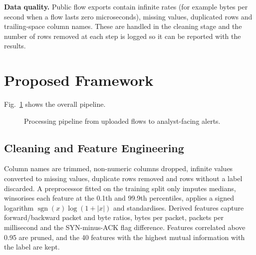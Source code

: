 \documentclass[conference]{IEEEtran}
\begin{document}
\textbf{Data quality.} Public flow exports contain infinite rates (for example bytes per second when a flow lasts zero microseconds), missing values, duplicated rows and trailing-space column names. These are handled in the cleaning stage and the number of rows removed at each step is logged so it can be reported with the results.

\section{Proposed Framework}
Fig.~\ref{fig:arch} shows the overall pipeline.

\begin{figure}[!htb]
\centering
{}
\caption{Processing pipeline from uploaded flows to analyst-facing alerts.}
\label{fig:arch}
\end{figure}

\subsection{Cleaning and Feature Engineering}
Column names are trimmed, non-numeric columns dropped, infinite values converted to missing values, duplicate rows removed and rows without a label discarded. A preprocessor fitted on the training split only imputes medians, winsorises each feature at the 0.1th and 99.9th percentiles, applies a signed logarithm $\operatorname{sgn}(x)\log(1+|x|)$ and standardises. Derived features capture forward/backward packet and byte ratios, bytes per packet, packets per millisecond and the SYN-minus-ACK flag difference. Features correlated above 0.95 are pruned, and the 40 features with the highest mutual information with the label are kept.
\end{document}
